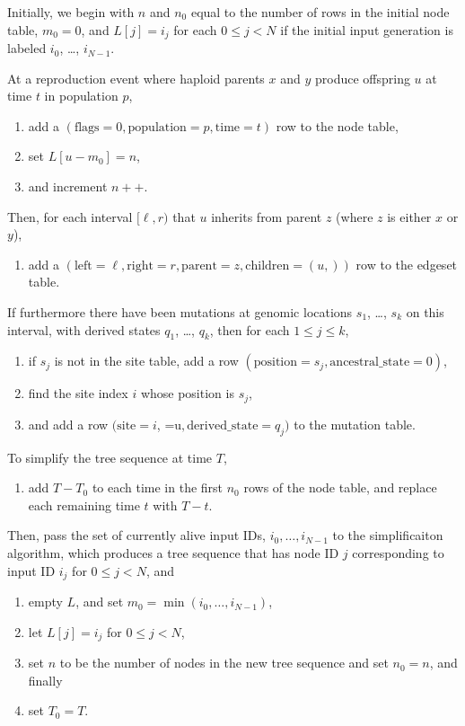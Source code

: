 \documentclass{article}
\begin{document}
Initially, we begin with $n$ and $n_0$ equal to the number of rows in the initial node table,
$m_0 = 0$, and $L[j] = i_j$ for each $0 \le j < N$ if the initial input generation is labeled
$i_0$, \ldots, $i_{N-1}$.

At a reproduction event where haploid parents $x$ and $y$ produce offspring $u$ 
at time $t$ in population $p$,
\begin{enumerate}
    \item add a 
        $(
        \text{flags}=0,
        \text{population}=p, 
        \text{time}=t)$ row to the node table,
    \item set $L[u-m_0] = n$,
    \item and increment $n++$.
\end{enumerate}
Then, for each interval $[\ell,r)$ that $u$ inherits from parent $z$
(where $z$ is either $x$ or $y$),
\begin{enumerate}[resume]
    \item add a 
        $( \text{left}=\ell,
        \text{right}=r, 
        \text{parent}=z, 
        \text{children}=(u,))$ row to the edgeset table.
\end{enumerate}
If furthermore there have been mutations at genomic locations $s_1$, \ldots, $s_k$
on this interval,
with derived states $q_1$, \ldots, $q_k$,
then for each $1 \le j \le k$,
\begin{enumerate}[resume]
    \item if $s_j$ is not in the site table, add a row
        $( \text{position}=s_j,
        \text{ancestral\_state}=0)$,
    \item find the site index $i$ whose position is $s_j$,
    \item and add a row
        $( \text{site}=i$,
           =u$,
        \text{derived\_state}=q_j)$ to the mutation table.
\end{enumerate}

To simplify the tree sequence at time $T$,
\begin{enumerate}
    \item add $T-T_0$ to each time in the first $n_0$ rows of the node table,
        and replace each remaining time $t$ with $T-t$.
\end{enumerate}
Then, pass the set of currently alive input IDs,
$i_0, \ldots, i_{N-1}$ to the simplificaiton algorithm,
which produces a tree sequence that has node ID $j$ corresponding to input ID $i_j$
for $0 \le j < N$, and
\begin{enumerate}[resume]
    \item empty $L$, and set $m_0 = \min(i_0, \ldots, i_{N-1})$,
    \item let $L[j] = i_j$ for $0 \le j < N$,
    \item set $n$ to be the number of nodes in the new tree sequence and set $n_0 = n$, and finally
    \item set $T_0 = T$.
\end{enumerate}
\end{document}
